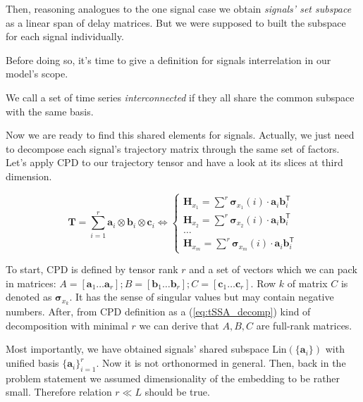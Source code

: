 	Then, reasoning analogues to the one signal case we obtain \emph{signals' set subspace} as a linear span of delay matrices. But we were supposed to built the subspace for each signal individually.
	
	Before doing so, it's time to give a definition for signals interrelation in our model's scope.
	
	\begin{Def}		
		We call a set of time series \emph{interconnected} if they all share the common subspace with the same basis.
	\end{Def}
	
	Now we are ready to find this shared elements for signals. Actually, we just need to decompose each signal's trajectory matrix through the same set of factors. Let's apply CPD to our trajectory tensor and have a look at its slices at third dimension.
	
	\begin{equation}\label{eq:tSSA_decomp}
		\mathbf{T} = \sum\limits_{i = 1}^{r} \mathbf{a}_i \otimes \mathbf{b}_i \otimes \mathbf{c}_i \Leftrightarrow \begin{cases}
			\mathbf{H}_{x_1} = \sum\limits^{r} \boldsymbol{\sigma}_{x_1}(i) \cdot \mathbf{a}_i  \mathbf{b}_i^{\mathsf{T}}  \\
			\mathbf{H}_{x_2} = \sum\limits^{r} \boldsymbol{\sigma}_{x_2}(i) \cdot \mathbf{a}_i  \mathbf{b}_i^{\mathsf{T}} \\
			\ldots \\
			\mathbf{H}_{x_m} = \sum\limits^{r} \boldsymbol{\sigma}_{x_m}(i) \cdot \mathbf{a}_i  \mathbf{b}_i^{\mathsf{T}} 
		\end{cases}
	\end{equation}
	
	To start, CPD is defined by tensor rank $ r $ and a set of vectors which we can pack in matrices: $ A = [\mathbf{a}_1 \ldots \mathbf{a}_r]; B = [\mathbf{b}_1 \ldots \mathbf{b}_r]; C = [\mathbf{c}_1 \ldots \mathbf{c}_r] $. Row $ k $ of matrix $ C $ is denoted as $ \boldsymbol{\sigma}_{x_k} $. It has the sense of singular values but may contain negative numbers. After, from CPD definition as a (\ref{eq:tSSA_decomp}) kind of decomposition with minimal $ r $ we can derive that $ A, B, C $ are full-rank matrices.
	
	Most importantly, we have obtained signals' shared subspace $ \text{Lin}(\{\mathbf{a}_i\}) $ with unified basis $ \{\mathbf{a}_i\}_{i = 1}^r $. Now it is not orthonormed in general. Then, back in the problem statement we assumed dimensionality of the embedding to be rather small. Therefore relation $ r \ll L $ should be true.
	
